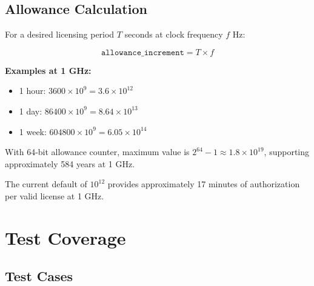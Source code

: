 \documentclass[11pt]{article}
\begin{document}
\subsection{Allowance Calculation}

For a desired licensing period $T$ seconds at clock frequency $f$ Hz:

\[
\texttt{allowance\_increment} = T \times f
\]

\textbf{Examples at 1 GHz:}
\begin{itemize}
    \item 1 hour: $3600 \times 10^9 = 3.6 \times 10^{12}$
    \item 1 day: $86400 \times 10^9 = 8.64 \times 10^{13}$
    \item 1 week: $604800 \times 10^9 = 6.05 \times 10^{14}$
\end{itemize}

With 64-bit allowance counter, maximum value is $2^{64} - 1 \approx 1.8 \times 10^{19}$, supporting approximately 584 years at 1 GHz.

The current default of $10^{12}$ provides approximately 17 minutes of authorization per valid license at 1 GHz.

\section{Test Coverage}

\subsection{Test Cases}
\end{document}
